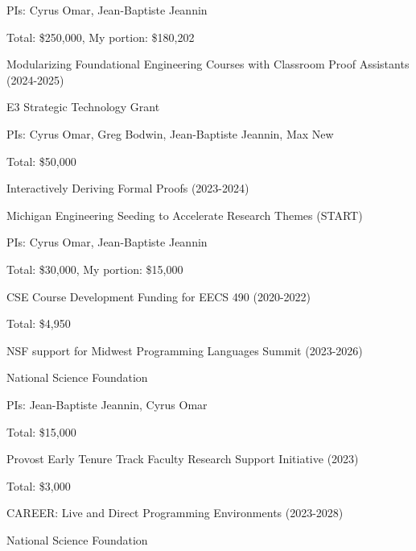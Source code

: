 \documentclass[10pt,letterpaper]{article}
\renewenvironment{itemize}{
  \begin{list}{}{
    \setlength{\leftmargin}{1.25em}
    \setlength{\itemsep}{0.25em}
    \setlength{\parskip}{0pt}
    \setlength{\parsep}{0.2em}
  }
}{
  \end{list}
}
\begin{document}
\begin{itemize}
\begin{itemize}
      \item PIs: Cyrus Omar, Jean-Baptiste Jeannin
      \item Total: \$250,000, My portion: \$180,202
    \end{itemize}
  \item Modularizing Foundational Engineering Courses with Classroom Proof Assistants (2024-2025)
    \begin{itemize}
      \item E3 Strategic Technology Grant
      \item PIs: Cyrus Omar, Greg Bodwin, Jean-Baptiste Jeannin, Max New
      \item Total: \$50,000
    \end{itemize}
  \item Interactively Deriving Formal Proofs (2023-2024)
        \begin{itemize}
          \item Michigan Engineering Seeding to Accelerate Research Themes (START)
          \item PIs: Cyrus Omar, Jean-Baptiste Jeannin
          \item Total: \$30,000, My portion: \$15,000
        \end{itemize}
  \item CSE Course Development Funding for EECS 490 (2020-2022)
        \begin{itemize}
          \item Total: \$4,950
        \end{itemize}
  \item NSF support for Midwest Programming Languages Summit (2023-2026)
        \begin{itemize}
          \item National Science Foundation
          \item PIs: Jean-Baptiste Jeannin, Cyrus Omar
          \item Total: \$15,000
        \end{itemize}
  \item Provost Early Tenure Track Faculty Research Support Initiative (2023)
        \begin{itemize}
          \item Total: \$3,000
        \end{itemize}
  \item CAREER: Live and Direct Programming Environments (2023-2028)
        \begin{itemize}
          \item National Science Foundation 

\end{itemize}
\end{itemize}
\end{document}
